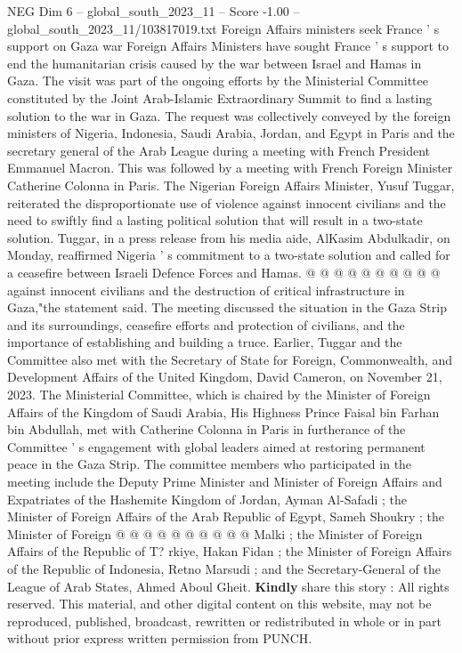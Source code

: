 \begin{textsample}{NEG Dim 6 – global\_south\_2023\_11 – Score -1.00 – global\_south\_2023\_11/103817019.txt}  \label{ex:f6_neg_150}
Foreign Affairs ministers seek France ' s support on Gaza war Foreign Affairs Ministers have sought France ' s support to end the humanitarian crisis caused by the war between Israel and Hamas in Gaza.
The visit was part of the ongoing efforts by the Ministerial Committee constituted by the Joint Arab-Islamic Extraordinary Summit to find a lasting solution to the war in Gaza.
The request was collectively conveyed by the foreign ministers of Nigeria, Indonesia, Saudi Arabia, Jordan, and Egypt in Paris and the secretary general of the Arab League during a meeting with French President Emmanuel Macron.
This was followed by a meeting with French Foreign Minister Catherine Colonna in Paris.
The Nigerian Foreign Affairs Minister, Yusuf Tuggar, reiterated the disproportionate use of violence against innocent civilians and the need to swiftly find a lasting political solution that will result in a two-state solution.
Tuggar, in a press release from his media aide, AlKasim Abdulkadir, on Monday, reaffirmed Nigeria ' s commitment to a two-state solution and called for a ceasefire between Israeli Defence Forces and Hamas. @ @ @ @ @ @ @ @ @ @ against innocent civilians and the destruction of critical infrastructure in Gaza,"the statement said.
The meeting discussed the situation in the Gaza Strip and its surroundings, ceasefire efforts and protection of civilians, and the importance of establishing and building a truce.
Earlier, Tuggar and the Committee also met with the Secretary of State for Foreign, Commonwealth, and Development Affairs of the United Kingdom, David Cameron, on November 21, 2023.
The Ministerial Committee, which is chaired by the Minister of Foreign Affairs of the Kingdom of Saudi Arabia, His Highness Prince Faisal bin Farhan bin Abdullah, met with Catherine Colonna in Paris in furtherance of the Committee ' s engagement with global leaders aimed at restoring permanent peace in the Gaza Strip.
The committee members who participated in the meeting include the Deputy Prime Minister and Minister of Foreign Affairs and Expatriates of the Hashemite Kingdom of Jordan, Ayman Al-Safadi ; the Minister of Foreign Affairs of the Arab Republic of Egypt, Sameh Shoukry ; the Minister of Foreign @ @ @ @ @ @ @ @ @ @ Malki ; the Minister of Foreign Affairs of the Republic of T? rkiye, Hakan Fidan ; the Minister of Foreign Affairs of the Republic of Indonesia, Retno Marsudi ; and the Secretary-General of the League of Arab States, Ahmed Aboul Gheit. \textbf{Kindly} share this story : All rights reserved.
This material, and other digital content on this website, may not be reproduced, published, broadcast, rewritten or redistributed in whole or in part without prior express written permission from PUNCH.

\end{textsample}
